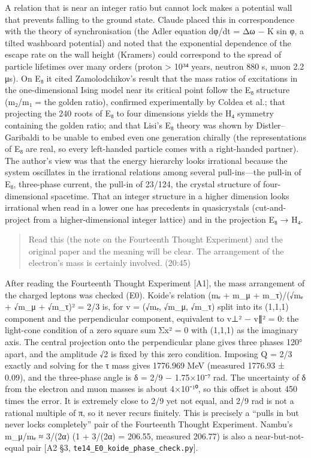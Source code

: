 \documentclass[
  a4paper,
]{article}
\begin{document}
A relation that is near an integer ratio but cannot lock makes a
potential wall that prevents falling to the ground state. Claude placed
this in correspondence with the theory of synchronisation (the Adler
equation dφ/dt = Δω − K sin φ, a tilted washboard potential) and noted
that the exponential dependence of the escape rate on the wall height
(Kramers) could correspond to the spread of particle lifetimes over many
orders (proton \textgreater{} 10³⁴ years, neutron 880 s, muon 2.2 μs).
On E₈ it cited Zamolodchikov's result that the mass ratios of
excitations in the one-dimensional Ising model near its critical point
follow the E₈ structure (m₂/m₁ = the golden ratio), confirmed
experimentally by Coldea et al.; that projecting the 240 roots of E₈ to
four dimensions yields the H₄ symmetry containing the golden ratio; and
that Lisi's E₈ theory was shown by Distler--Garibaldi to be unable to
embed even one generation chirally (the representations of E₈ are real,
so every left-handed particle comes with a right-handed partner). The
author's view was that the energy hierarchy looks irrational because the
system oscillates in the irrational relations among several
pull-ins---the pull-in of E₈, three-phase current, the pull-in of
23/124, the crystal structure of four-dimensional spacetime. That an
integer structure in a higher dimension looks irrational when read in a
lower one has precedents in quasicrystals (cut-and-project from a
higher-dimensional integer lattice) and in the projection E₈ → H₄.

\begin{quote}
Read this (the note on the Fourteenth Thought Experiment) and the
original paper and the meaning will be clear. The arrangement of the
electron's mass is certainly involved. (20:45)
\end{quote}

After reading the Fourteenth Thought Experiment {[}A1{]}, the mass
arrangement of the charged leptons was checked (E0). Koide's relation
(mₑ + m\_μ + m\_τ)/(√mₑ + √m\_μ + √m\_τ)² = 2/3 is, for v = (√mₑ, √m\_μ,
√m\_τ) split into its (1,1,1) component and the perpendicular component,
equivalent to \textbar v⊥\textbar² − \textbar v∥\textbar² = 0: the
light-cone condition of a zero square sum Σx² = 0 with (1,1,1) as the
imaginary axis. The central projection onto the perpendicular plane
gives three phases 120° apart, and the amplitude √2 is fixed by this
zero condition. Imposing Q = 2/3 exactly and solving for the τ mass
gives 1776.969 MeV (measured 1776.93 ± 0.09), and the three-phase angle
is δ = 2/9 − 1.75×10⁻⁷ rad. The uncertainty of δ from the electron and
muon masses is about 4×10⁻¹⁰, so this offset is about 450 times the
error. It is extremely close to 2/9 yet not equal, and 2/9 rad is not a
rational multiple of π, so it never recurs finitely. This is precisely a
``pulls in but never locks completely'' pair of the Fourteenth Thought
Experiment. Nambu's m\_μ/mₑ ≈ 3/(2α) (1 + 3/(2α) = 206.55, measured
206.77) is also a near-but-not-equal pair {[}A2 §3,
\texttt{te14\_\allowbreak{}E0\_\allowbreak{}koide\_\allowbreak{}phase\_\allowbreak{}check.py}{]}.
\end{document}
